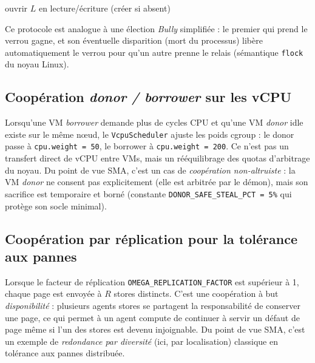 \begin{algorithm}[H]
\caption{Leader-election par \texttt{flock} (\texttt{GpuMultiplexer})}
\label{algo:leader-election}
ouvrir $L$ en lecture/écriture (créer si absent)\;
\end{algorithm}

Ce protocole est analogue à une élection \emph{Bully} simplifiée : le premier qui prend le verrou gagne, et son éventuelle disparition (mort du processus) libère automatiquement le verrou pour qu'un autre prenne le relais (sémantique \texttt{flock} du noyau Linux).

\subsection{Coopération \emph{donor / borrower} sur les vCPU}

Lorsqu'une VM \emph{borrower} demande plus de cycles CPU et qu'une VM \emph{donor} idle existe sur le même nœud, le \texttt{VcpuScheduler} ajuste les poids cgroup : le donor passe à \texttt{cpu.weight = 50}, le borrower à \texttt{cpu.weight = 200}. Ce n'est pas un transfert direct de vCPU entre VMs, mais un rééquilibrage des quotas d'arbitrage du noyau. Du point de vue SMA, c'est un cas de \emph{coopération non-altruiste} : la VM \emph{donor} ne consent pas explicitement (elle est arbitrée par le démon), mais son sacrifice est temporaire et borné (constante \texttt{DONOR\_SAFE\_STEAL\_PCT = 5\%} qui protège son socle minimal).

\subsection{Coopération par réplication pour la tolérance aux pannes}

Lorsque le facteur de réplication \texttt{OMEGA\_REPLICATION\_FACTOR} est supérieur à 1, chaque page est envoyée à $R$ stores distincts. C'est une coopération à but \emph{disponibilité} : plusieurs agents stores se partagent la responsabilité de conserver une page, ce qui permet à un agent compute de continuer à servir un défaut de page même si l'un des stores est devenu injoignable. Du point de vue SMA, c'est un exemple de \emph{redondance par diversité} (ici, par localisation) classique en tolérance aux pannes distribuée.

